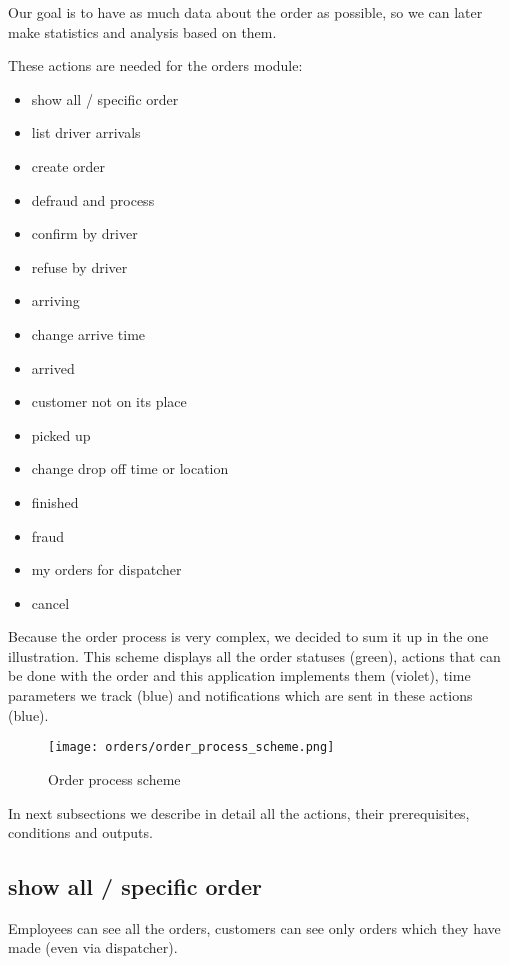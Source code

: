 		Our goal is to have as much data about the order as possible, so we can later make statistics and analysis based on them. 
		
		These actions are needed for the orders module:
		\begin{itemize}
			\item show all / specific order
			\item list driver arrivals
			\item create order
			\item defraud and process
			\item confirm by driver
			\item refuse by driver
			\item arriving
			\item change arrive time
			\item arrived
			\item customer not on its place
			\item picked up
			\item change drop off time or location
			\item finished
			\item fraud
			\item my orders for dispatcher
			\item cancel
		\end{itemize}
		
		Because the order process is very complex, we decided to sum it up in the one illustration. This scheme displays all the order statuses (green), actions that can be done with the order and this application implements them (violet), time parameters we track (blue) and notifications which are sent in these actions (blue).
		
		\begin{figure}[H]
			\centering
			\texttt{[image: orders/order\_process\_scheme.png]}
			\caption{Order process scheme}\label{order-process-scheme}
		\end{figure}
	
			In next subsections we describe in detail all the actions, their prerequisites, conditions and outputs.
		
		\subsection{show all / specific order}
			Employees can see all the orders, customers can see only orders which they have made (even via dispatcher).
			
